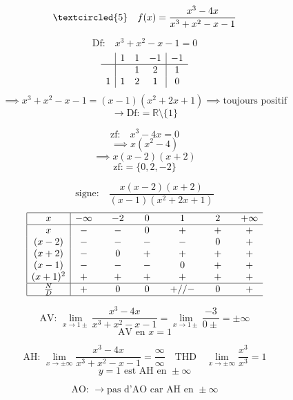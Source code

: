 \documentclass{article}
\begin{document}
\[ \textcircled{5} \quad f(x) = \frac{x^3 - 4x}{x^3 + x^2 - x - 1} \]

\[ \text{Df:} \quad x^3 + x^2 - x - 1 = 0 \]
\[ \begin{array}{c|ccc|c}
  & 1 & 1 & -1 & -1 \\
\hline
  &   & 1 & 2  & 1  \\
1 & 1 & 2 & 1  & 0
\end{array} \]
\[ \implies x^3 + x^2 - x - 1 = (x-1)(x^2 + 2x + 1) \implies \text{toujours positif} \]
\[ \rightarrow \text{Df:} = \mathbb{R} \setminus \{1\} \]

\[ \text{zf:} \quad x^3 - 4x = 0 \]
\[ \implies x(x^2 - 4) \]
\[ \implies x(x-2)(x+2) \]
\[ \text{zf:} = \{0, 2, -2\} \]

\[ \text{signe:} \quad \frac{x(x-2)(x+2)}{(x-1)(x^2+2x+1)} \]
\[ \begin{array}{|c|ccccccccccccc|}
\hline
x & -\infty & & -2 & & 0 & & 1 & & 2 & & +\infty \\
\hline
x & - & & - & & 0 & & + & & + & & + \\
(x-2) & - & & - & & - & & - & & 0 & & + \\
(x+2) & - & & 0 & & + & & + & & + & & + \\
(x-1) & - & & - & & - & & 0 & & + & & + \\
(x+1)^2 & + & & + & & + & & + & & + & & + \\
\hline
\frac{N}{D} & + & & 0 & & 0 & & + // - & & 0 & & + \\
\hline
\end{array} \]

\[ \text{AV: } \lim_{x \to 1\pm} \frac{x^3 - 4x}{x^3 + x^2 - x - 1} = \lim_{x \to 1\pm} \frac{-3}{0\pm} = \pm\infty \]
\[ \text{AV en } x=1\]

\[ \text{AH: } \lim_{x \to \pm\infty} \frac{x^3 - 4x}{x^3 + x^2 - x - 1} = \frac{\infty}{\infty} \quad \text{THD} \quad \lim_{x \to \pm\infty} \frac{x^3}{x^3} = 1 \]
\[ y=1 \text{ est AH en } \pm\infty \]

\[ \text{AO: } \rightarrow \text{pas d'AO car AH en } \pm\infty \]
\end{document}
